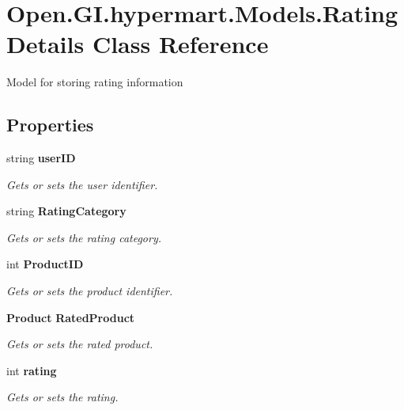 \section{Open.\+G\+I.\+hypermart.\+Models.\+Rating\+Details Class Reference}
\label{class_open_1_1_g_i_1_1hypermart_1_1_models_1_1_rating_details}


Model for storing rating information  


\subsection*{Properties}
\begin{DoxyCompactItemize}
\item 
string \textbf{ user\+ID}\hspace{0.3cm}{\ttfamily  [get, set]}
\begin{DoxyCompactList}\small\item\em Gets or sets the user identifier. \end{DoxyCompactList}\item 
string \textbf{ Rating\+Category}\hspace{0.3cm}{\ttfamily  [get, set]}
\begin{DoxyCompactList}\small\item\em Gets or sets the rating category. \end{DoxyCompactList}\item 
int \textbf{ Product\+ID}\hspace{0.3cm}{\ttfamily  [get, set]}
\begin{DoxyCompactList}\small\item\em Gets or sets the product identifier. \end{DoxyCompactList}\item 
\textbf{ Product} \textbf{ Rated\+Product}\hspace{0.3cm}{\ttfamily  [get, set]}
\begin{DoxyCompactList}\small\item\em Gets or sets the rated product. \end{DoxyCompactList}\item 
int \textbf{ rating}\hspace{0.3cm}{\ttfamily  [get, set]}
\begin{DoxyCompactList}\small\item\em Gets or sets the rating. \end{DoxyCompactList}\end{DoxyCompactItemize}


